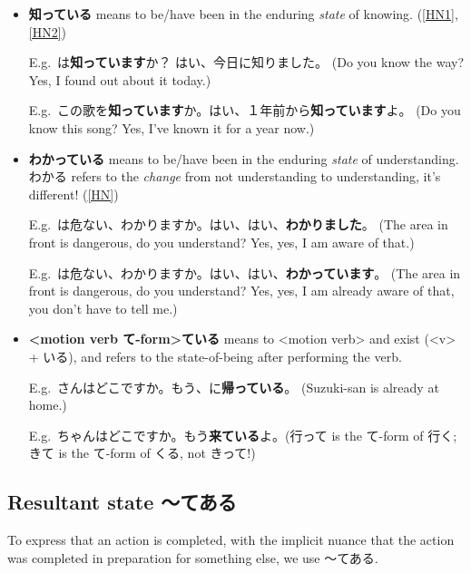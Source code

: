 \documentclass[../nihongo-gakushuu-kyouzai.tex]{subfiles}
\begin{document}
\begin{itemize}
    \item \textbf{知っている} means to be/have been in the enduring \emph{state} of knowing.  (\href{https://ja.hinative.com/questions/258648}{[HN1]}, \href{https://ja.hinative.com/questions/10745394}{[HN2]})

    E.g.\ は\textbf{知っています}か？ はい、今日に知りました。 (Do you know the way? Yes, I found out about it today.)

    E.g.\ この歌を\textbf{知っています}か。はい、１年前から\textbf{知っています}よ。 (Do you know this song? Yes, I've known it for a year now.)

    \item \textbf{わかっている} means to be/have been in the enduring \emph{state} of understanding. わかる refers to the \emph{change} from not understanding to understanding, it's different! (\href{https://ja.hinative.com/questions/355185}{[HN]})

    E.g.\ は危ない、わかりますか。はい、はい、\textbf{わかりました}。 (The area in front is dangerous, do you understand? Yes, yes, I am aware of that.)

    E.g.\ は危ない、わかりますか。はい、はい、\textbf{わかっています}。 (The area in front is dangerous, do you understand? Yes, yes, I am already aware of that, you don't have to tell me.)

    \item \textbf{<motion verb て-form>ている} means to <motion verb> and exist (<v> + いる), and refers to the state-of-being after performing the verb.

    E.g.\ さんはどこですか。もう、に\textbf{帰っている}。 (Suzuki-san is already at home.)

    E.g.\ ちゃんはどこですか。もう\textbf{来ている}よ。(行って is the て-form of 行く; きて is the て-form of くる, not きって!)
\end{itemize}


\subsection{Resultant state 〜てある} \label{sec:resultant-state-tearu}
To express that an action is completed, with the implicit nuance that the action was completed in preparation for something else, we use 〜てある.
\end{document}
